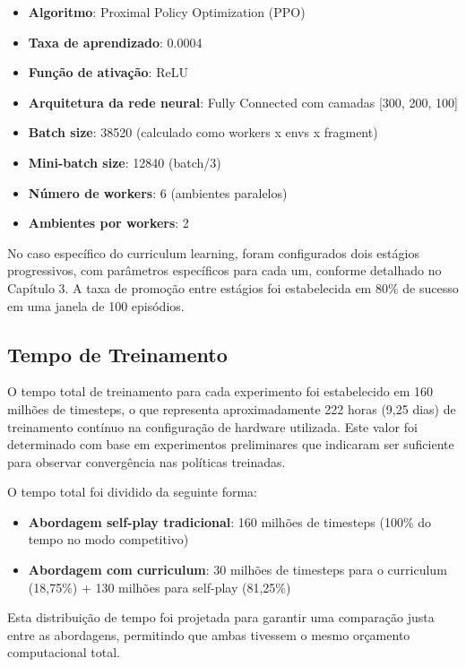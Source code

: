 \begin{itemize}
    \item \textbf{Algoritmo}: Proximal Policy Optimization (PPO)
    \item \textbf{Taxa de aprendizado}: 0.0004
    \item \textbf{Função de ativação}: ReLU
    \item \textbf{Arquitetura da rede neural}: Fully Connected com camadas [300, 200, 100]
    \item \textbf{Batch size}: 38520 (calculado como workers x envs x fragment)
    \item \textbf{Mini-batch size}: 12840 (batch/3)
    \item \textbf{Número de workers}: 6 (ambientes paralelos)
    \item \textbf{Ambientes por workers}: 2
\end{itemize}

No caso específico do curriculum learning, foram configurados dois estágios progressivos, com parâmetros específicos para cada um, conforme detalhado no Capítulo 3. A taxa de promoção entre estágios foi estabelecida em 80\% de sucesso em uma janela de 100 episódios.

\subsection{Tempo de Treinamento}

O tempo total de treinamento para cada experimento foi estabelecido em 160 milhões de timesteps, o que representa aproximadamente 222 horas (9,25 dias) de treinamento contínuo na configuração de hardware utilizada. Este valor foi determinado com base em experimentos preliminares que indicaram ser suficiente para observar convergência nas políticas treinadas.

O tempo total foi dividido da seguinte forma:

\begin{itemize}
    \item \textbf{Abordagem self-play tradicional}: 160 milhões de timesteps (100\% do tempo no modo competitivo)
    \item \textbf{Abordagem com curriculum}: 30 milhões de timesteps para o curriculum (18,75\%) + 130 milhões para self-play (81,25\%)
\end{itemize}

Esta distribuição de tempo foi projetada para garantir uma comparação justa entre as abordagens, permitindo que ambas tivessem o mesmo orçamento computacional total.

